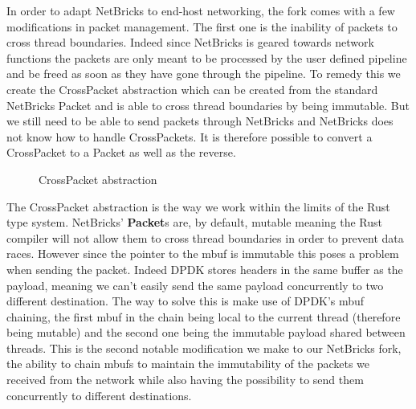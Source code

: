 \documentclass[11pt]{book}
\begin{document}
In order to adapt NetBricks to end-host networking, the fork comes
with a few modifications in packet management. The first one is the
inability of packets to cross thread boundaries. Indeed since
NetBricks is geared towards network functions the packets are only
meant to be processed by the user defined pipeline and be freed as
soon as they have gone through the pipeline. To remedy this we create
the CrossPacket abstraction which can be created from the standard
NetBricks Packet and is able to cross thread boundaries by being
immutable. But we still need to be able to send packets through
NetBricks and NetBricks does not know how to handle CrossPackets. It
is therefore possible to convert a CrossPacket to a Packet as well as
the reverse.

\begin{figure}[htb!]
  
  \caption{CrossPacket abstraction}
  \label{code:crosspacket}
\end{figure}

The CrossPacket abstraction is the way we work within the limits of
the Rust type system. NetBricks' \textbf{Packet}s are, by default,
mutable meaning the Rust compiler will not allow them to cross thread
boundaries in order to prevent data races. However since the
pointer to the mbuf is immutable this poses a problem when sending the
packet. Indeed DPDK stores headers in the same buffer as the payload,
meaning we can't easily send the same payload concurrently to two
different destination. The way to solve this is make use of DPDK's
mbuf chaining, the first mbuf in the chain being local to the current
thread (therefore being mutable) and the second one being the
immutable payload shared between threads. This is the second notable
modification we make to our NetBricks fork, the ability to chain mbufs
to maintain the immutability of the packets we received from the
network while also having the possibility to send them concurrently to
different destinations.
\end{document}
